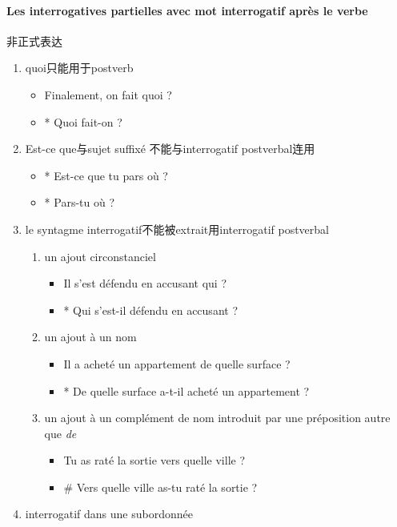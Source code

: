 \documentclass[UTF8]{report}
\begin{document}
\paragraph{Les interrogatives partielles avec mot interrogatif après le verbe}
非正式表达
\begin{enumerate}
    \item quoi只能用于postverb
    \begin{itemize}
        \item Finalement, on fait quoi ?
        \item * Quoi fait-on ?
    \end{itemize}
    \item Est-ce que与sujet suffixé 不能与interrogatif postverbal连用
    \begin{itemize}
        \item * Est-ce que tu pars où ?
        \item * Pars-tu où ?
    \end{itemize}
    \item le syntagme interrogatif不能被extrait用interrogatif postverbal
    \begin{enumerate}
        \item un ajout circonstanciel
        \begin{itemize}
            \item Il s’est défendu en accusant qui ?
            \item * Qui s’est-il défendu en accusant ?
        \end{itemize}
        \item un ajout à un nom
        \begin{itemize}
            \item Il a acheté un appartement de quelle surface ?
            \item * De quelle surface a-t-il acheté un appartement ?
        \end{itemize}
        \item un ajout à un complément de nom introduit par une préposition autre que \textit{de}
        \begin{itemize}
            \item Tu as raté la sortie vers quelle ville ?
            \item \# Vers quelle ville as-tu raté la sortie ?
        \end{itemize}
    \end{enumerate}
    \item interrogatif dans une subordonnée

\end{enumerate}
\end{document}

